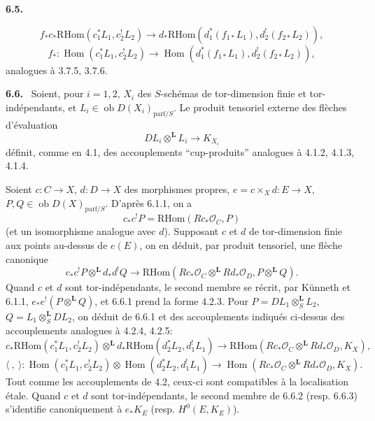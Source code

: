 \documentclass[11pt]{article}
\newenvironment{statement}[1]{\par\medskip\noindent\textbf{#1.}\ }{\par\medskip}
\DeclareMathOperator{\Hom}{Hom}
\newcommand{\ob}{\operatorname{ob}}
\providecommand{\RHom}{\mathrm{RHom}}
\providecommand{\parf}{\mathrm{parf}}
\providecommand{\LL}{\mathbf L}
\providecommand{\OO}{\mathcal O}
\begin{document}
\begin{statement}{6.5}

\begin{equation}
\tag{6.5.4}
f_*c_*\RHom(c_1^*L_1,c_2^!L_2)
\longrightarrow
d_*\RHom(d_1^*(f_{1*}L_1),d_2^!(f_{2*}L_2)),
\end{equation}
\begin{equation}
\tag{6.5.5}
f_*:\Hom(c_1^*L_1,c_2^!L_2)
\longrightarrow
\Hom(d_1^*(f_{1*}L_1),d_2^!(f_{2*}L_2)),
\end{equation}
analogues à 3.7.5, 3.7.6.
\end{statement}

\begin{statement}{6.6}
Soient, pour $i=1,2$, $X_i$ des $S$-schémas de tor-dimension finie et tor-indépendants, et $L_i\in\ob D(X_i)_{\parf/S}$. Le produit tensoriel externe des flèches d'évaluation
\[
DL_i\otimes^{\LL}L_i\longrightarrow K_{X_i}
\]
définit, comme en 4.1, des accouplements ``cup-produits'' analogues à 4.1.2, 4.1.3, 4.1.4.

Soient $c:C\to X$, $d:D\to X$ des morphismes propres, $e=c\times_X d:E\to X$, $P,Q\in\ob D(X)_{\parf/S}$. D'après 6.1.1, on a
\[
c_*c^!P=\RHom(Rc_*\OO_C,P)
\]
(et un isomorphisme analogue avec $d$). Supposant $c$ et $d$ de tor-dimension finie aux points au-dessus de $e(E)$, on en déduit, par produit tensoriel, une flèche canonique
\begin{equation}
\tag{6.6.1}
c_*c^!P\otimes^{\LL}d_*d^!Q
\longrightarrow
\RHom(Rc_*\OO_C\otimes^{\LL}Rd_*\OO_D,P\otimes^{\LL}Q).
\end{equation}
Quand $c$ et $d$ sont tor-indépendants, le second membre se récrit, par Künneth et 6.1.1, $e_*e^!(P\otimes^{\LL}Q)$, et 6.6.1 prend la forme 4.2.3. Pour $P=DL_1\otimes_S^{\LL}L_2$, $Q=L_1\otimes_S^{\LL}DL_2$, on déduit de 6.6.1 et des accouplements indiqués ci-dessus des accouplements analogues à 4.2.4, 4.2.5:
\begin{equation}
\tag{6.6.2}
c_*\RHom(c_1^*L_1,c_2^!L_2)\otimes^{\LL}d_*\RHom(d_2^*L_2,d_1^!L_1)
\longrightarrow
\RHom(Rc_*\OO_C\otimes^{\LL}Rd_*\OO_D,K_X),
\end{equation}
\begin{equation}
\tag{6.6.3}
\langle\ ,\ \rangle:\Hom(c_1^*L_1,c_2^!L_2)\otimes\Hom(d_2^*L_2,d_1^!L_1)
\longrightarrow
\Hom(Rc_*\OO_C\otimes^{\LL}Rd_*\OO_D,K_X).
\end{equation}
Tout comme les accouplements de 4.2, ceux-ci sont compatibles à la localisation étale. Quand $c$ et $d$ sont tor-indépendants, le second membre de 6.6.2 (resp. 6.6.3) s'identifie canoniquement à $e_*K_E$ (resp. $H^0(E,K_E)$).
\end{statement}
\end{document}

